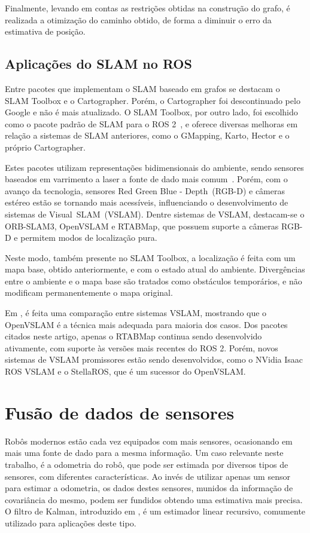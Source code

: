 \documentclass[repeatfields,xlists,xpacks,oneside,yearsonly]{ufrgscca}
\begin{document}
Finalmente, levando em contas as restrições obtidas na construção do
grafo, é realizada a otimização do caminho obtido, de forma a
diminuir o erro da estimativa de posição.

\subsection{Aplicações do SLAM no ROS}

Entre pacotes que implementam o SLAM baseado em grafos se destacam o
SLAM Toolbox e o Cartographer. Porém, o Cartographer foi
descontinuado pelo Google e não é mais atualizado. O SLAM Toolbox,
por outro lado, foi escolhido como o pacote padrão de SLAM para o ROS
2~\cite{slam_toolbox_ros_standard}, e oferece diversas melhoras em
relação a sistemas de SLAM anteriores, como o GMapping, Karto, Hector
e o próprio Cartographer.

Estes pacotes utilizam representações bidimensionais do ambiente,
sendo sensores baseados em varrimento a laser a fonte de dado mais
comum~\cite{SensorAndSLAM}. Porém, com o avanço da tecnologia,
sensores Red Green Blue - Depth~(RGB-D) e câmeras estéreo estão se
tornando mais acessíveis, influenciando o desenvolvimento de sistemas
de Visual~SLAM~(VSLAM). Dentre sistemas de VSLAM, destacam-se o
ORB-SLAM3, OpenVSLAM e RTABMap, que possuem suporte a câmeras RGB-D e
permitem modos de localização pura.

Neste modo, também presente no SLAM Toolbox, a localização é feita
com um mapa base, obtido anteriormente, e com o estado atual do
ambiente. Divergências entre o ambiente e o mapa base são tratados
como obstáculos temporários, e não modificam permanentemente o mapa
original.

Em \textcite{VSLAM}, é feita uma comparação entre sistemas VSLAM,
mostrando que o OpenVSLAM é a técnica mais adequada para maioria dos
casos. Dos pacotes citados neste artigo, apenas o RTABMap continua
sendo desenvolvido ativamente, com suporte às versões mais recentes
do ROS 2. Porém, novos sistemas de VSLAM promissores estão sendo
desenvolvidos, como o NVidia Isaac ROS VSLAM e o StellaROS, que é um
sucessor do OpenVSLAM.

\section{Fusão de dados de sensores}

Robôs modernos estão cada vez equipados com mais sensores,
ocasionando em mais uma fonte de dado para a mesma informação. Um
caso relevante neste trabalho, é a odometria do robô, que pode ser
estimada por diversos tipos de sensores, com diferentes
características. Ao invés de utilizar apenas um sensor para estimar a
odometria, os dados destes sensores, munidos da informação de
covariância do mesmo, podem ser fundidos obtendo uma estimativa mais
precisa. O filtro de Kalman, introduzido em \textcite{KalmanFilter},
é um estimador linear recursivo, comumente utilizado para aplicações
deste tipo.
\end{document}
